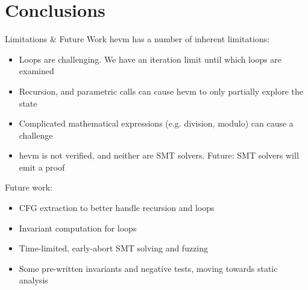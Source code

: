 \documentclass[aspectratio=169]{beamer}
\begin{document}
\section{Conclusions}

\begin{frame}[fragile=singleslide]{Limitations \& Future Work}
hevm has a number of inherent limitations:

\begin{itemize}
\item Loops are challenging. We have an iteration limit until which loops are examined
\item Recursion, and parametric calls can cause hevm to only partially explore the state
\item Complicated mathematical expressions (e.g. division, modulo) can cause a challenge
\item hevm is not verified, and neither are SMT solvers. Future: SMT solvers will emit a proof
\end{itemize}
\vspace{2ex}

Future work:
\begin{itemize}
\item CFG extraction to better handle recursion and loops
\item Invariant computation for loops
\item Time-limited, early-abort SMT solving and fuzzing
\item Some pre-written invariants and negative tests, moving towards static analysis
\end{itemize}
\end{frame}

%
%
%
%
\end{document}
